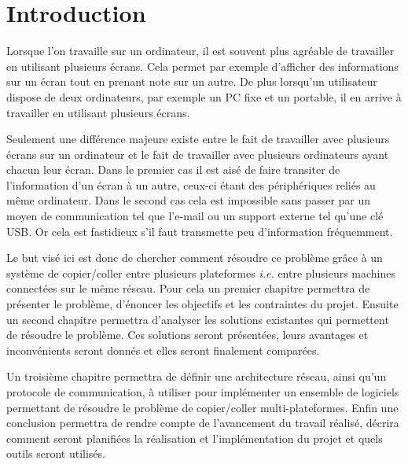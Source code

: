 \chapter*{Introduction}
\renewcommand{\leftmark}{INTRODUCTION}

Lorsque l'on travaille sur un ordinateur, il est souvent plus agréable
de travailler en utilisant plusieurs écrans. Cela permet par exemple
d'afficher des informations sur un écran tout en prenant note sur un autre.
De plus lorsqu'un utilisateur dispose de deux ordinateurs, par exemple
un PC fixe et un portable, il en arrive à travailler en utilisant plusieurs
écrans.

Seulement une différence majeure existe entre le fait de travailler
avec plusieurs écrans sur un ordinateur et le fait de travailler avec
plusieurs ordinateurs ayant chacun leur écran. Dans le premier cas il est
aisé de faire transiter de l'information d'un écran à un autre, ceux-ci
étant des périphériques reliés au même ordinateur. Dans le second cas
cela est impossible sans passer par un moyen de communication tel que l'e-mail
ou un support externe tel qu'une clé USB. Or cela est fastidieux
s'il faut transmette peu d'information fréquemment.

Le but visé ici est donc de chercher comment résoudre ce problème grâce
à un système de copier/coller entre plusieurs plateformes \emph{i.e.} entre
plusieurs machines connectées sur le même réseau.
Pour cela un premier chapitre permettra de présenter le problème, d'énoncer
les objectifs et les contraintes du projet. Ensuite un second chapitre
permettra d'analyser les solutions existantes qui permettent de résoudre
le problème. Ces solutions seront présentées, leurs avantages et inconvénients
seront donnés et elles seront finalement comparées.

Un troisième chapitre
permettra de définir une architecture réseau, ainsi qu'un protocole de
communication, à utiliser pour implémenter un ensemble de logiciels
permettant de résoudre le problème de copier/coller multi-plateformes.
Enfin une conclusion permettra de rendre compte de l'avancement du travail
réalisé, décrira comment seront  planifiées la réalisation et l'implémentation
du projet et quels outils seront utilisés.
